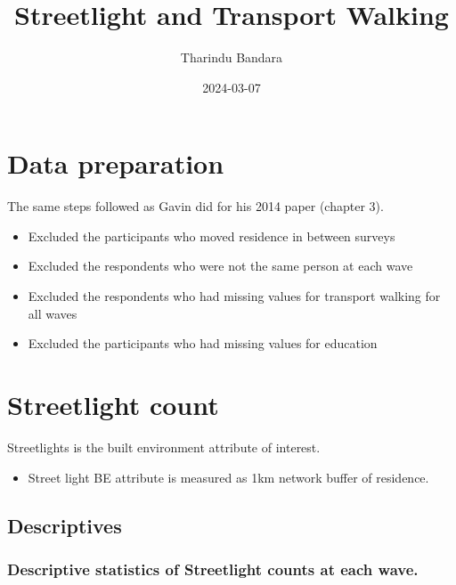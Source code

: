 \documentclass[
]{book}
\title{Streetlight and Transport Walking}
\author{Tharindu Bandara}
\date{2024-03-07}
\providecommand{\tightlist}{%
  \setlength{\itemsep}{0pt}\setlength{\parskip}{0pt}}
\begin{document}
\maketitle

{
\setcounter{tocdepth}{1}
\tableofcontents
}
\hypertarget{data-preparation}{%
\chapter{Data preparation}\label{data-preparation}}

The same steps followed as Gavin did for his 2014 paper (chapter 3).

\begin{itemize}
\tightlist
\item
  Excluded the participants who moved residence in between surveys
\item
  Excluded the respondents who were not the same person at each wave
\item
  Excluded the respondents who had missing values for transport walking for all waves
\item
  Excluded the participants who had missing values for education
\end{itemize}

\hypertarget{streetlight-count}{%
\chapter{Streetlight count}\label{streetlight-count}}

Streetlights is the built environment attribute of interest.

\begin{itemize}
\tightlist
\item
  Street light BE attribute is measured as 1km network buffer of residence.
\end{itemize}

\hypertarget{descriptives}{%
\section{Descriptives}\label{descriptives}}

\hypertarget{descriptive-statistics-of-streetlight-counts-at-each-wave.}{%
\subsection{Descriptive statistics of Streetlight counts at each wave.}\label{descriptive-statistics-of-streetlight-counts-at-each-wave.}}
\end{document}

